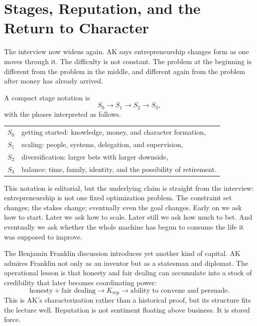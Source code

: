 \section{Stages, Reputation, and the Return to Character}

The interview now widens again. AK says entrepreneurship changes form as one moves through it. The difficulty is not constant. The problem at the beginning is different from the problem in the middle, and different again from the problem after money has already arrived.

A compact stage notation is
\begin{equation}
S_0 \to S_1 \to S_2 \to S_3,
\end{equation}
with the phases interpreted as follows.

\begin{table}[h]
\centering
\begin{tabular}{ll}
\(S_0\) & getting started: knowledge, money, and character formation,\\
\(S_1\) & scaling: people, systems, delegation, and supervision,\\
\(S_2\) & diversification: larger bets with larger downside,\\
\(S_3\) & balance: time, family, identity, and the possibility of retirement.
\end{tabular}
\end{table}

This notation is editorial, but the underlying claim is straight from the interview: entrepreneurship is not one fixed optimization problem. The constraint set changes; the stakes change; eventually even the goal changes. Early on we ask how to start. Later we ask how to scale. Later still we ask how much to bet. And eventually we ask whether the whole machine has begun to consume the life it was supposed to improve.

The Benjamin Franklin discussion introduces yet another kind of capital. AK admires Franklin not only as an inventor but as a statesman and diplomat. The operational lesson is that honesty and fair dealing can accumulate into a stock of credibility that later becomes coordinating power:
\begin{equation}
\text{honesty} + \text{fair dealing}
\longrightarrow
K_{\text{rep}}
\longrightarrow
\text{ability to convene and persuade}.
\end{equation}
This is AK's characterization rather than a historical proof, but its structure fits the lecture well. Reputation is not sentiment floating above business. It is stored force.

